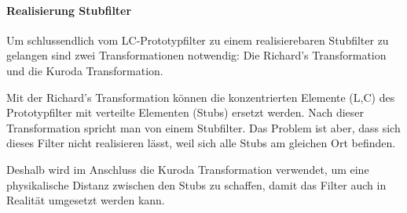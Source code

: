 \paragraph{Realisierung Stubfilter}

Um schlussendlich vom LC-Prototypfilter zu einem realisierebaren Stubfilter zu gelangen sind zwei Transformationen notwendig: Die Richard's Transformation und die Kuroda Transformation.

Mit der Richard's Transformation können die konzentrierten Elemente (L,C) des Prototypfilter mit verteilte Elementen (Stubs) ersetzt werden. Nach dieser Transformation spricht man von einem Stubfilter. Das Problem ist aber, dass sich dieses Filter nicht realisieren lässt, weil sich alle Stubs am gleichen Ort befinden. 

Deshalb wird im Anschluss die Kuroda Transformation verwendet,  um eine physikalische Distanz zwischen
den  Stubs  zu  schaffen, damit das Filter auch in Realit\"at umgesetzt  werden  kann.





















